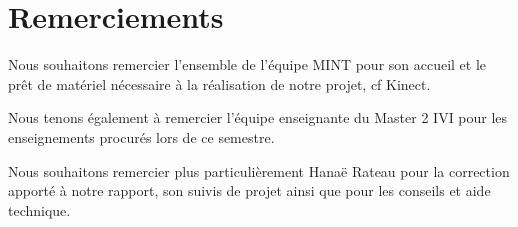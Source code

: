 \chapter*{Remerciements}

Nous souhaitons remercier l'ensemble de l'équipe MINT pour son accueil et le prêt de matériel nécessaire à la réalisation de notre projet, cf Kinect. 

Nous tenons également à remercier l’équipe enseignante du Master 2 IVI pour les enseignements procurés lors de ce semestre. 

Nous souhaitons remercier plus particulièrement Hanaë Rateau pour la correction apporté à notre rapport, son suivis de projet ainsi que pour les conseils et aide technique.

